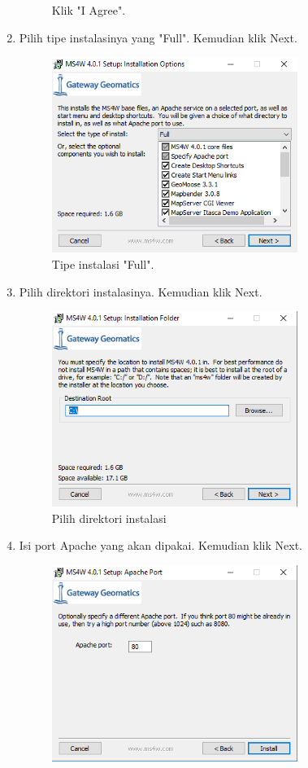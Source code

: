 \begin{enumerate}
\begin{figure}[H]
		\centering
		\caption{Klik "I Agree".}
	\end{figure}
	\item  Pilih tipe instalasinya yang "Full". Kemudian klik Next.
	\hfill\break
	\begin{figure}[H]
		\includegraphics[width=8cm]{figures/Tugas4/1174089/4.png}
		\centering
		\caption{Tipe instalasi "Full".}
	\end{figure}
	\item  Pilih direktori instalasinya. Kemudian klik Next.
	\hfill\break
	\begin{figure}[H]
		\includegraphics[width=8cm]{figures/Tugas4/1174089/5.png}
		\centering
		\caption{Pilih direktori instalasi}
	\end{figure}
	\item  Isi port Apache yang akan dipakai. Kemudian klik Next.
	\hfill\break
	\begin{figure}[H]
		\includegraphics[width=8cm]{figures/Tugas4/1174089/6.png}

\end{figure}
\end{enumerate}
